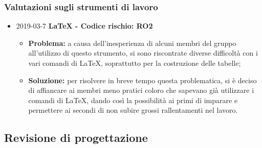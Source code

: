 \subsubsection{Valutazioni sugli strumenti di lavoro}
\begin{itemize}
				
		\item 2019-03-7 \textbf{\LaTeX{} - Codice rischio: RO2} \\
		\begin{itemize}
			\item \textbf{Problema:} a causa dell'inesperienza di alcuni membri del gruppo all'utilizzo di questo strumento, si sono riscontrate diverse difficoltà con i vari comandi di \LaTeX{}, soprattutto per la costruzione delle tabelle;
			\item \textbf{Soluzione:} per risolvere in breve tempo questa problematica, si è deciso di affiancare
		ai membri meno pratici coloro che sapevano già utilizzare i comandi di \LaTeX{}, dando
		così la possibilità ai primi di imparare e permettere ai secondi di non 
		subire grossi rallentamenti nel lavoro.
		\end{itemize}		
		
\end{itemize}

\subsection{Revisione di progettazione}

